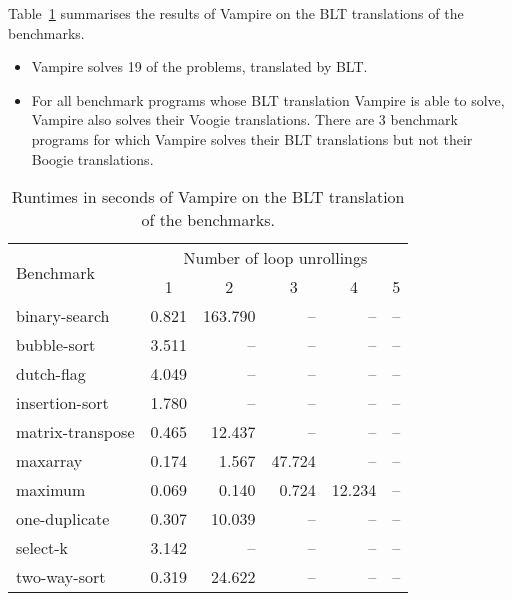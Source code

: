 Table~\ref{table:boogie/blt-results} summarises the results of Vampire on the BLT translations of the benchmarks.
\begin{itemize}
  \item Vampire solves 19 of the problems, translated by BLT.
  \item For all benchmark programs whose BLT translation Vampire is able to solve, Vampire also solves their Voogie translations. There are 3 benchmark programs for which Vampire solves their BLT translations but not their Boogie translations.
\end{itemize}

\begin{table}\center
  \caption{Runtimes in seconds of Vampire on the BLT translation of the benchmarks.}
  \label{table:boogie/blt-results}
  \begin{tabular}{lrrrrr}
\hline
\multirow{2}{*}{Benchmark} & \multicolumn{5}{c}{Number of loop unrollings} \\ %
& \multicolumn{1}{c}{1} & \multicolumn{1}{c}{2} & \multicolumn{1}{c}{3} & \multicolumn{1}{c}{4} & \multicolumn{1}{c}{5} \\
\hline
binary-search    & 0.821 & 163.790 &     -- &     -- & -- \\
bubble-sort      & 3.511 &      -- &     -- &     -- & -- \\
dutch-flag       & 4.049 &      -- &     -- &     -- & -- \\
insertion-sort   & 1.780 &      -- &     -- &     -- & -- \\
matrix-transpose & 0.465 &  12.437 &     -- &     -- & -- \\
maxarray         & 0.174 &   1.567 & 47.724 &     -- & -- \\
maximum          & 0.069 &   0.140 &  0.724 & 12.234 & -- \\
one-duplicate    & 0.307 &  10.039 &     -- &     -- & -- \\
select-k         & 3.142 &      -- &     -- &     -- & -- \\
two-way-sort     & 0.319 &  24.622 &     -- &     -- & -- \\
  \end{tabular}
\end{table}

